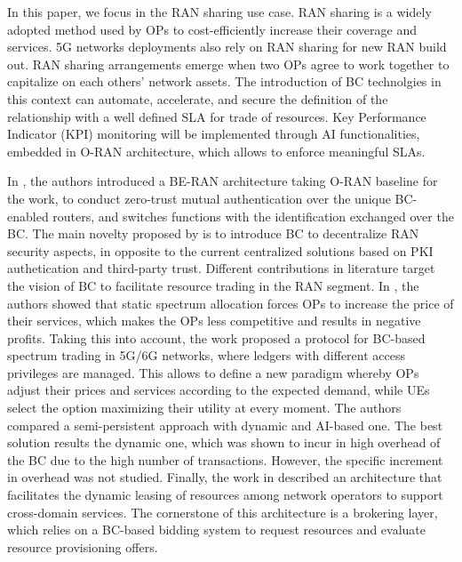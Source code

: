 \documentclass[journal]{IEEEtran}
\begin{document}
In this paper, we focus in the RAN sharing use case. RAN sharing is a widely adopted method used by OPs to cost-efficiently increase their coverage and services. 5G networks deployments also rely on RAN sharing for new RAN build out. RAN sharing arrangements emerge when two OPs agree to work together to capitalize on each others’ network assets. The introduction of BC technolgies in this context can automate, accelerate, and secure the definition of the relationship with a well defined SLA for trade of resources. Key Performance Indicator (KPI) monitoring will be implemented through AI functionalities, embedded in O-RAN architecture, which allows to enforce meaningful SLAs. 

In \cite{xu2021ran}, the authors introduced a BE-RAN architecture taking O-RAN baseline for the work, to conduct zero-trust mutual authentication over the unique BC-enabled routers, and switches functions with the identification exchanged over the BC. The main novelty proposed by \cite{xu2021ran} is to introduce BC to decentralize RAN security aspects, in opposite to the current centralized solutions based on PKI authetication and third-party trust. Different contributions in literature target the vision of BC to facilitate resource trading in the RAN segment. In \cite{maksymyuk2020blockchain}, the authors showed that static spectrum allocation forces OPs to increase the price of their services, which makes the OPs less competitive and results in negative profits. Taking this into account, the work proposed a protocol for BC-based spectrum trading in 5G/6G networks, where ledgers with different access privileges are managed. This allows to define a new paradigm whereby OPs adjust their prices and services according to the expected demand, while UEs select the option maximizing their utility at every moment. The authors compared a semi-persistent approach with dynamic and AI-based one. The best solution results the dynamic one, which was shown to incur in high overhead of the BC due to the high number of transactions. However, the specific increment in overhead was not studied. Finally, the work in \cite{togou2020dbns} described an architecture that facilitates the dynamic leasing of resources among network operators to support cross-domain services. The cornerstone of this architecture is a brokering layer, which relies on a BC-based bidding system to request resources and evaluate resource provisioning offers. 
\end{document}
